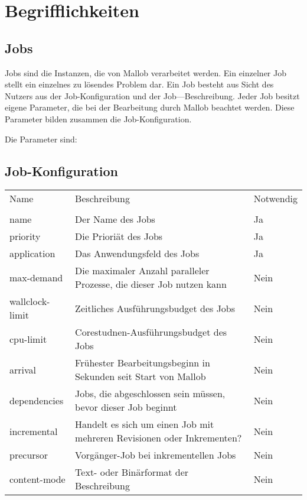 \section{Begrifflichkeiten}
\label{B:Jobs}
\subsection{Jobs}

Jobs sind die Instanzen, die von Mallob verarbeitet werden. Ein einzelner Job stellt ein einzelnes zu lösendes Problem dar. Ein Job besteht aus Sicht des Nutzers aus der Job-Konfiguration und der Job—Beschreibung.
Jeder Job besitzt eigene Parameter, die bei der Bearbeitung durch Mallob beachtet werden. 
Diese Parameter bilden zusammen die Job-Konfiguration.

Die Parameter sind:

\subsection{Job-Konfiguration}


\begin{tabular}{lL{0.6\textwidth}l}
        Name & Beschreibung & Notwendig\\
        \\
        name & Der Name des Jobs & Ja\\
        priority & Die Prioriät des Jobs & Ja\\
        application & Das Anwendungsfeld des Jobs & Ja\\ 
        max-demand & Die maximaler Anzahl paralleler Prozesse, die dieser Job nutzen kann & Nein\\
        wallclock-limit & Zeitliches Ausführungsbudget des Jobs & Nein\\
        cpu-limit & Corestudnen-Ausführungsbudget des Jobs & Nein\\
        arrival & Frühester Bearbeitungsbeginn in Sekunden seit Start von Mallob & Nein\\
        dependencies & Jobs, die abgeschlossen sein müssen, bevor dieser Job beginnt & Nein\\
        incremental & Handelt es sich um einen Job mit mehreren Revisionen oder Inkrementen? &  Nein\\
        precursor & Vorgänger-Job bei inkrementellen Jobs & Nein\\
        content-mode & Text- oder Binärformat der Beschreibung & Nein\\
    \end{tabular} 

